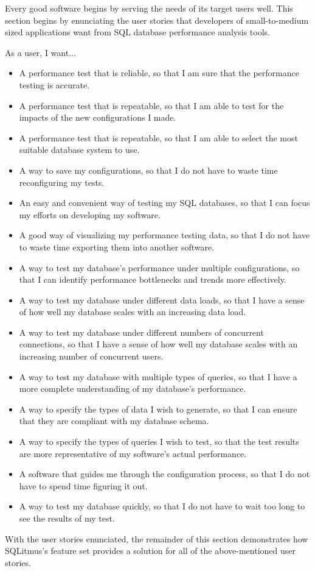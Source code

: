 \documentclass[12pt]{article}
\begin{document}
\begin{spacing}{1.9}
		Every good software begins by serving the needs of its target users well. This section begins by enunciating the user stories that developers of small-to-medium sized applications want from SQL database performance analysis tools. 
		
		As a user, I want...
		\begin{itemize}
			
			\item A performance test that is reliable, so that I am sure that the performance testing is accurate.
			\item A performance test that is repeatable, so that I am able to test for the impacts of the new configurations I made.
			\item A performance test that is repeatable, so that I am able to select the most suitable database system to use.
			\item A way to save my configurations, so that I do not have to waste time reconfiguring my tests.
			\item An easy and convenient way of testing my SQL databases, so that I can focus my efforts on developing my software.
			\item A good way of visualizing my performance testing data, so that I do not have to waste time exporting them into another software.
			\item A way to test my database's performance under multiple configurations, so that I can identify performance bottlenecks and trends more effectively. 
			\item A way to test my database under different data loads, so that I have a sense of how well my database scales with an increasing data load.
			\item A way to test my database under different numbers of concurrent connections, so that I have a sense of how well my database scales with an increasing number of concurrent users.
			\item A way to test my database with multiple types of queries, so that I have a more complete understanding of my database's performance.
			\item A way to specify the types of data I wish to generate, so that I can ensure that they are compliant with my database schema.
			\item A way to specify the types of queries I wish to test, so that the test results are more representative of my software's actual performance.
			\item A software that guides me through the configuration process, so that I do not have to spend time figuring it out.
			\item A way to test my database quickly, so that I do not have to wait too long to see the results of my test.
		\end{itemize}
		With the user stories enunciated, the remainder of this section demonstrates how SQLitmus's feature set provides a solution for all of the above-mentioned user stories.
		

\end{spacing}
\end{document}
